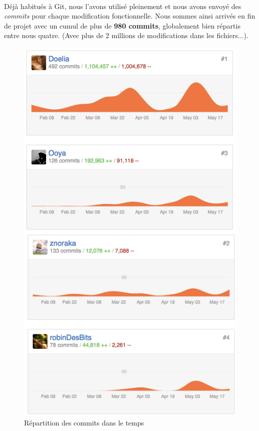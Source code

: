 \paragraph{}
Déjà habitués à Git, nous l'avons utilisé pleinement et nous avons envoyé des \emph{commits} pour chaque modification fonctionnelle. Nous sommes ainsi arrivés en fin de projet avec un cumul de plus de \textbf{980 commits}, globalement bien répartis entre nous quatre. (Avec plus de 2 millions de modifications dans les fichiers...).
 
\begin{figure}[H]\centering
  \includegraphics[scale=.5]{./img/github_commits.png}
  \caption{Répartition des commits dans le temps}
  \label{github_commits}
\end{figure}
 
